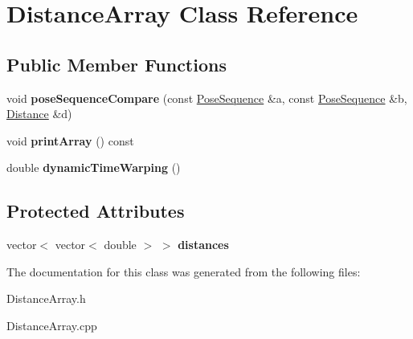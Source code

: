 \hypertarget{classDistanceArray}{}\section{Distance\+Array Class Reference}
\label{classDistanceArray}
\subsection*{Public Member Functions}
\begin{DoxyCompactItemize}
\item 
\hypertarget{classDistanceArray_ab84470888c50b602528d99860812404d}{}void {\bfseries pose\+Sequence\+Compare} (const \hyperlink{classPoseSequence}{Pose\+Sequence} \&a, const \hyperlink{classPoseSequence}{Pose\+Sequence} \&b, \hyperlink{classDistance}{Distance} \&d)\label{classDistanceArray_ab84470888c50b602528d99860812404d}

\item 
\hypertarget{classDistanceArray_abfefe1b3d781a062854d6a2191dc1194}{}void {\bfseries print\+Array} () const \label{classDistanceArray_abfefe1b3d781a062854d6a2191dc1194}

\item 
\hypertarget{classDistanceArray_a099459f0426eae862635871c85765b27}{}double {\bfseries dynamic\+Time\+Warping} ()\label{classDistanceArray_a099459f0426eae862635871c85765b27}

\end{DoxyCompactItemize}
\subsection*{Protected Attributes}
\begin{DoxyCompactItemize}
\item 
\hypertarget{classDistanceArray_a924227e33f2574d2bae0f35e9d73bcef}{}vector$<$ vector$<$ double $>$ $>$ {\bfseries distances}\label{classDistanceArray_a924227e33f2574d2bae0f35e9d73bcef}

\end{DoxyCompactItemize}


The documentation for this class was generated from the following files\+:\begin{DoxyCompactItemize}
\item 
Distance\+Array.\+h\item 
Distance\+Array.\+cpp\end{DoxyCompactItemize}
